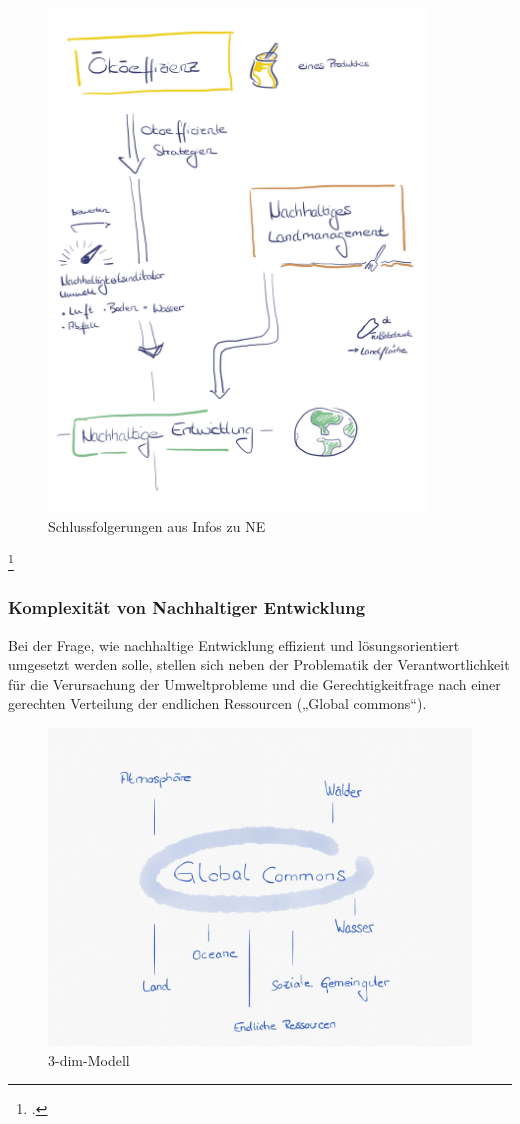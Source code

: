 \documentclass{scrartcl}
\begin{document}
   
\begin{figure}[htbp]
\centering
\includegraphics[width=10cm]{image_folder/NE_folgerungen.png}
\caption{Schlussfolgerungen aus Infos zu NE}
\label{fig:Folgerung_NE}
\end{figure}\footcite{Eigene Darstellung}


\subsubsection{Komplexität von Nachhaltiger Entwicklung}
Bei der Frage, wie nachhaltige Entwicklung effizient und lösungsorientiert umgesetzt werden solle, stellen sich neben der Problematik der Verantwortlichkeit für die Verursachung der Umweltprobleme und die Gerechtigkeitfrage nach einer gerechten Verteilung der endlichen Ressourcen („Global commons“). 
\begin{figure}[htbp]
\centering
\includegraphics[width=14cm]{image_folder/globalcommons.png}
\caption{3-dim-Modell}
\label{fig: global commons}
\end{figure}
\end{document}
